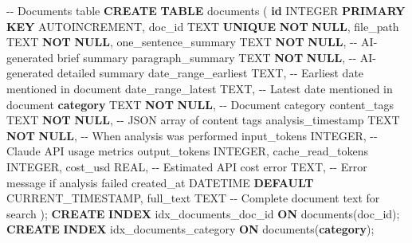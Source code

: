 \documentclass[
  italian,
  a4paper,
]{article}
\newenvironment{Shaded}{\begin{snugshade}}{\end{snugshade}}
\newcommand{\CommentTok}[1]{\textcolor[rgb]{0.37,0.37,0.37}{#1}}
\newcommand{\DataTypeTok}[1]{\textcolor[rgb]{0.68,0.00,0.00}{#1}}
\newcommand{\FunctionTok}[1]{\textcolor[rgb]{0.28,0.35,0.67}{#1}}
\newcommand{\KeywordTok}[1]{\textcolor[rgb]{0.00,0.23,0.31}{\textbf{#1}}}
\newcommand{\NormalTok}[1]{\textcolor[rgb]{0.00,0.23,0.31}{#1}}
\begin{document}
\begin{Shaded}
\begin{Highlighting}[]
\CommentTok{{-}{-} Documents table}
\KeywordTok{CREATE} \KeywordTok{TABLE}\NormalTok{ documents (}
  \KeywordTok{id} \DataTypeTok{INTEGER} \KeywordTok{PRIMARY} \KeywordTok{KEY}\NormalTok{ AUTOINCREMENT,}
\NormalTok{  doc\_id TEXT }\KeywordTok{UNIQUE} \KeywordTok{NOT} \KeywordTok{NULL}\NormalTok{,}
\NormalTok{  file\_path TEXT }\KeywordTok{NOT} \KeywordTok{NULL}\NormalTok{,}
\NormalTok{  one\_sentence\_summary TEXT }\KeywordTok{NOT} \KeywordTok{NULL}\NormalTok{,      }\CommentTok{{-}{-} AI{-}generated brief summary}
\NormalTok{  paragraph\_summary TEXT }\KeywordTok{NOT} \KeywordTok{NULL}\NormalTok{,         }\CommentTok{{-}{-} AI{-}generated detailed summary}
\NormalTok{  date\_range\_earliest TEXT,                }\CommentTok{{-}{-} Earliest date mentioned in document}
\NormalTok{  date\_range\_latest TEXT,                  }\CommentTok{{-}{-} Latest date mentioned in document}
  \KeywordTok{category}\NormalTok{ TEXT }\KeywordTok{NOT} \KeywordTok{NULL}\NormalTok{,                  }\CommentTok{{-}{-} Document category}
\NormalTok{  content\_tags TEXT }\KeywordTok{NOT} \KeywordTok{NULL}\NormalTok{,              }\CommentTok{{-}{-} JSON array of content tags}
\NormalTok{  analysis\_timestamp TEXT }\KeywordTok{NOT} \KeywordTok{NULL}\NormalTok{,        }\CommentTok{{-}{-} When analysis was performed}
\NormalTok{  input\_tokens }\DataTypeTok{INTEGER}\NormalTok{,                    }\CommentTok{{-}{-} Claude API usage metrics}
\NormalTok{  output\_tokens }\DataTypeTok{INTEGER}\NormalTok{,}
\NormalTok{  cache\_read\_tokens }\DataTypeTok{INTEGER}\NormalTok{,}
\NormalTok{  cost\_usd }\DataTypeTok{REAL}\NormalTok{,                          }\CommentTok{{-}{-} Estimated API cost}
\NormalTok{  error TEXT,                             }\CommentTok{{-}{-} Error message if analysis failed}
\NormalTok{  created\_at DATETIME }\KeywordTok{DEFAULT} \FunctionTok{CURRENT\_TIMESTAMP}\NormalTok{,}
\NormalTok{  full\_text TEXT                          }\CommentTok{{-}{-} Complete document text for search}
\NormalTok{);}
\KeywordTok{CREATE} \KeywordTok{INDEX}\NormalTok{ idx\_documents\_doc\_id }\KeywordTok{ON}\NormalTok{ documents(doc\_id);}
\KeywordTok{CREATE} \KeywordTok{INDEX}\NormalTok{ idx\_documents\_category }\KeywordTok{ON}\NormalTok{ documents(}\KeywordTok{category}\NormalTok{);}


\end{Highlighting}
\end{Shaded}
\end{document}
